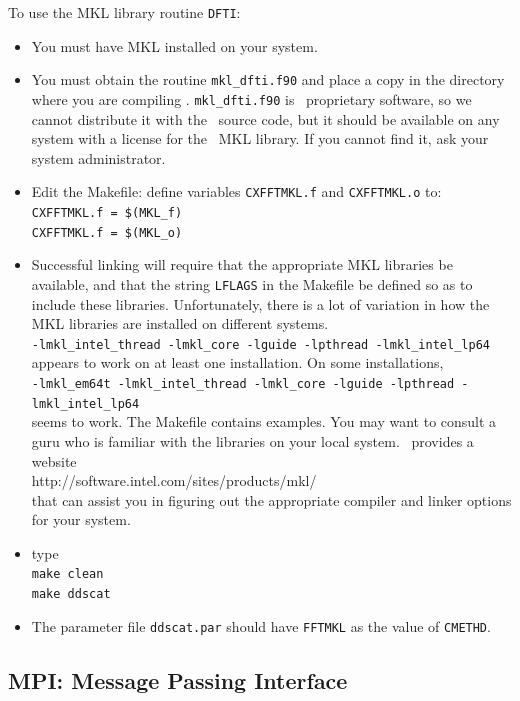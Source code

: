 To use the MKL library routine {\tt DFTI}:
\begin{itemize}
\item You must have MKL installed on your system.
\item You must obtain the routine {\tt mkl\_dfti.f90} and place a copy
      in the directory where you are compiling \ddscatv.  {\tt mkl\_dfti.f90}
      is \Intel\ proprietary software, so we cannot distribute it
      with the \ddscatv\ source code, but it
      should be available on any system with a license for the
      \Intel\ MKL library.
      If you cannot find it, ask your system administrator.
\item Edit the Makefile: define variables {\tt CXFFTMKL.f} and 
      {\tt CXFFTMKL.o} to:\\
        {\tt CXFFTMKL.f = \$(MKL\_f)}\\
        {\tt CXFFTMKL.f = \$(MKL\_o)}
\item Successful linking will require that the appropriate MKL libraries
be available, and that the string {\tt LFLAGS} in the Makefile be
defined so as to include these libraries.
Unfortunately, there is a lot of variation in how the MKL
libraries are installed on different systems.\\
{\footnotesize\tt -lmkl\_intel\_thread -lmkl\_core -lguide 
-lpthread -lmkl\_intel\_lp64}\\ 
appears to work on at least one installation.
On some installations,\\ 
{\footnotesize\tt -lmkl\_em64t -lmkl\_intel\_thread -lmkl\_core -lguide 
-lpthread -lmkl\_intel\_lp64}\\ 
seems to work.  The Makefile contains examples.
You may want to consult a guru who is familiar with the libraries
on your local system.
\Intel\ provides a website\\
 http://software.intel.com/sites/products/mkl/\\
that can assist you in figuring out 
the appropriate compiler and linker options
for your system.

\item type\\
       {\tt make clean}\\
       {\tt make ddscat}
\item The parameter file {\tt ddscat.par} should have {\tt FFTMKL} 
as the value of {\tt CMETHD}.
\end{itemize}

\subsection{ MPI: Message Passing Interface
            \label{sec:MPI}
            }

